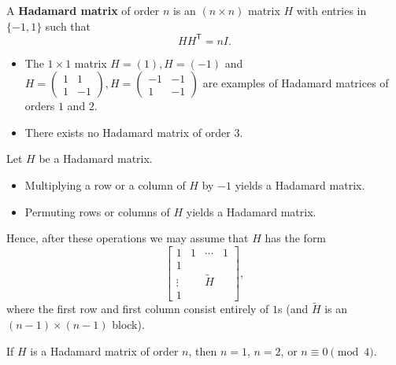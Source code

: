 \documentclass[11pt, a4paper]{ctexrep}
\begin{document}
\begin{definition}
    A \textbf{Hadamard matrix} of order $n$ is an $(n\times n)$ matrix $H$ with entries in $\{-1,1\}$ such that
    \[
        HH^{\mathsf T}=nI.
    \]
\end{definition}

\begin{example}\leavevmode
    \begin{itemize}
        \item The $1\times 1$ matrix $H=(1), H=(-1)$ and $H=\begin{pmatrix}1&1\\1&-1\end{pmatrix}, H=\begin{pmatrix}-1&-1\\1&-1\end{pmatrix}$ are examples of Hadamard matrices of orders $1$ and $2$.
        \item There exists no Hadamard matrix of order $3$.
    \end{itemize}
\end{example}

Let $H$ be a Hadamard matrix.
\begin{itemize}
    \item Multiplying a row or a column of $H$ by $-1$ yields a Hadamard matrix.
    \item Permuting rows or columns of $H$ yields a Hadamard matrix.
\end{itemize}
Hence, after these operations we may assume that $H$ has the form
\[
    \begin{bmatrix}
        1      & 1 & \cdots        & 1 \\
        1      &   &               &   \\
        \vdots &   & \widetilde{H} &   \\
        1      &   &               &
    \end{bmatrix},
\]
where the first row and first column consist entirely of $1$s (and $\widetilde{H}$ is an $(n-1)\times(n-1)$ block).

\begin{theorem}\label{thm:hadamard-order}
    If $H$ is a Hadamard matrix of order $n$, then $n=1$, $n=2$, or $n\equiv 0\pmod{4}$.
\end{theorem}
\end{document}
